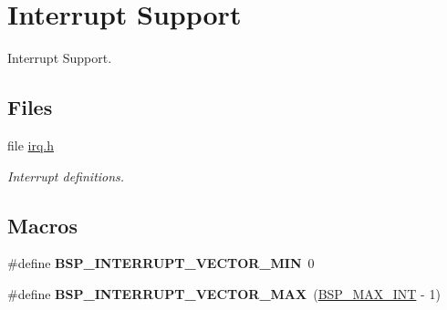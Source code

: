 \hypertarget{group__edb7312__interrupt}{}\section{Interrupt Support}
\label{group__edb7312__interrupt}


Interrupt Support.  


\subsection*{Files}
\begin{DoxyCompactItemize}
\item 
file \mbox{\hyperlink{bsps_2arm_2edb7312_2include_2bsp_2irq_8h}{irq.\+h}}
\begin{DoxyCompactList}\small\item\em Interrupt definitions. \end{DoxyCompactList}\end{DoxyCompactItemize}
\subsection*{Macros}
\begin{DoxyCompactItemize}
\item 
\mbox{\label{group__edb7312__interrupt_ga64cbb02dfea4d6923abccaa0087d2a0d}} 
\#define {\bfseries B\+S\+P\+\_\+\+I\+N\+T\+E\+R\+R\+U\+P\+T\+\_\+\+V\+E\+C\+T\+O\+R\+\_\+\+M\+IN}~0
\item 
\mbox{\label{group__edb7312__interrupt_gae4a2cdda5816a4c83c2fac0a49880c6e}} 
\#define {\bfseries B\+S\+P\+\_\+\+I\+N\+T\+E\+R\+R\+U\+P\+T\+\_\+\+V\+E\+C\+T\+O\+R\+\_\+\+M\+AX}~(\mbox{\hyperlink{group__RTEMSBSPsARMGumstix_ga33750fa8211ef2e4abe8d852443af594}{B\+S\+P\+\_\+\+M\+A\+X\+\_\+\+I\+NT}} -\/ 1)
\end{DoxyCompactItemize}

